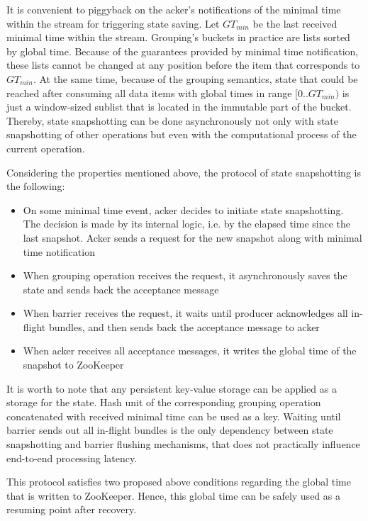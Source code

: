 It is convenient to piggyback on the acker's notifications of the minimal time within the stream for triggering state saving. Let $GT_{min}$ be the last received minimal time within the stream. Grouping's buckets in practice are lists sorted by global time. Because of the guarantees provided by minimal time notification, these lists cannot be changed at any position before the item that corresponds to $GT_{min}$. At the same time, because of the grouping semantics, state that could be reached after consuming all data items with global times in range $[0..GT_{min})$ is just a window-sized sublist that is located in the immutable part of the bucket. Thereby, state snapshotting can be done asynchronously not only with state snapshotting of other operations but even with the computational process of the current operation.

Considering the properties mentioned above, the protocol of state snapshotting is the following:

\begin{itemize}
    \item On some minimal time event, acker decides to initiate state snapshotting. The decision is made by its internal logic, i.e. by the elapsed time since the last snapshot. Acker sends a request for the new snapshot along with minimal time notification
    \item When grouping operation receives the request, it asynchronously saves the state and sends back the acceptance message   
    \item When barrier receives the request, it waits until producer acknowledges all in-flight bundles, and then sends back the acceptance message to acker
    \item When acker receives all acceptance messages, it writes the global time of the snapshot to ZooKeeper 
\end{itemize}

It is worth to note that any persistent key-value storage can be applied as a storage for the state. Hash unit of the corresponding grouping operation concatenated with received minimal time can be used as a key. Waiting until barrier sends out all in-flight bundles is the only dependency between state snapshotting and barrier flushing mechanisms, that does not practically influence end-to-end processing latency. 

This protocol satisfies two proposed above conditions regarding the global time that is written to ZooKeeper. Hence, this global time can be safely used as a resuming point after recovery.

